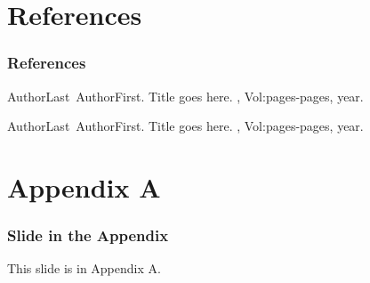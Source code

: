 \documentclass{beamer}
\begin{document}
\section{References}
\begin{frame}
	\frametitle{References}
	\begin{thebibliography}{Example 1 (2010)}
	
		AuthorLast~AuthorFirst.
		\newblock Title goes here.
		, Vol:pages-pages, year.
		
		AuthorLast~AuthorFirst.
		\newblock Title goes here.
		, Vol:pages-pages, year.
	\end{thebibliography}
\end{frame}

\section{Appendix A}
\begin{frame}
	\frametitle{Slide in the Appendix}
	
	This slide is in Appendix A.
\end{frame}
\end{document}
